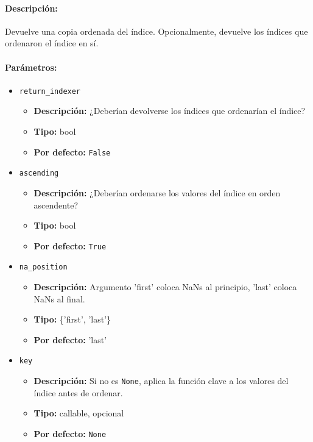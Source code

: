     \paragraph{Descripción:}
    Devuelve una copia ordenada del índice. Opcionalmente, devuelve los índices que ordenaron el índice en sí.

    \paragraph{Parámetros:}

    \begin{itemize}
        \item \texttt{return\_indexer}
            \begin{itemize}
                \item \textbf{Descripción:} ¿Deberían devolverse los índices que ordenarían el índice?
                \item \textbf{Tipo:} bool
                \item \textbf{Por defecto:} \texttt{False}
            \end{itemize}
        \item \texttt{ascending}
            \begin{itemize}
                \item \textbf{Descripción:} ¿Deberían ordenarse los valores del índice en orden ascendente?
                \item \textbf{Tipo:} bool
                \item \textbf{Por defecto:} \texttt{True}
            \end{itemize}
        \item \texttt{na\_position}
            \begin{itemize}
                \item \textbf{Descripción:} Argumento 'first' coloca NaNs al principio, 'last' coloca NaNs al final.
                \item \textbf{Tipo:} \{'first', 'last'\}
                \item \textbf{Por defecto:} 'last'
            \end{itemize}
        \item \texttt{key}
            \begin{itemize}
                \item \textbf{Descripción:} Si no es \texttt{None}, aplica la función clave a los valores del índice antes de ordenar.
                \item \textbf{Tipo:} callable, opcional
                \item \textbf{Por defecto:} \texttt{None}
            \end{itemize}
    \end{itemize}


